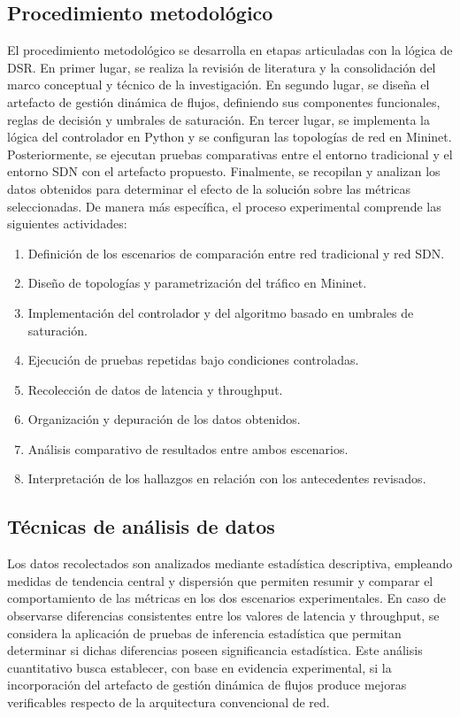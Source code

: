 \documentclass[12pt,a4paper]{article}
\begin{document}
\subsection{Procedimiento metodológico}
El procedimiento metodológico se desarrolla en etapas articuladas con la lógica de DSR. En primer lugar, se realiza la revisión de literatura y la consolidación del marco conceptual y técnico de la investigación. En segundo lugar, se diseña el artefacto de gestión dinámica de flujos, definiendo sus componentes funcionales, reglas de decisión y umbrales de saturación. En tercer lugar, se implementa la lógica del controlador en Python y se configuran las topologías de red en Mininet. Posteriormente, se ejecutan pruebas comparativas entre el entorno tradicional y el entorno SDN con el artefacto propuesto. Finalmente, se recopilan y analizan los datos obtenidos para determinar el efecto de la solución sobre las métricas seleccionadas.
De manera más específica, el proceso experimental comprende las siguientes actividades:
\begin{enumerate}
    \item Definición de los escenarios de comparación entre red tradicional y red SDN.
    \item Diseño de topologías y parametrización del tráfico en Mininet.
    \item Implementación del controlador y del algoritmo basado en umbrales de saturación.
    \item Ejecución de pruebas repetidas bajo condiciones controladas.
    \item Recolección de datos de latencia y throughput.
    \item Organización y depuración de los datos obtenidos.
    \item Análisis comparativo de resultados entre ambos escenarios.
    \item Interpretación de los hallazgos en relación con los antecedentes revisados.
\end{enumerate}
\subsection{Técnicas de análisis de datos}
Los datos recolectados son analizados mediante estadística descriptiva, empleando medidas de tendencia central y dispersión que permiten resumir y comparar el comportamiento de las métricas en los dos escenarios experimentales. En caso de observarse diferencias consistentes entre los valores de latencia y throughput, se considera la aplicación de pruebas de inferencia estadística que permitan determinar si dichas diferencias poseen significancia estadística. Este análisis cuantitativo busca establecer, con base en evidencia experimental, si la incorporación del artefacto de gestión dinámica de flujos produce mejoras verificables respecto de la arquitectura convencional de red.
\end{document}
